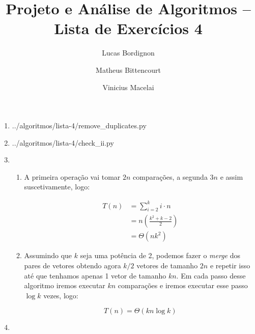 \documentclass{article}
\title{Projeto e Análise de Algoritmos -- Lista de Exercícios 4}
\author{Lucas Bordignon \and Matheus Bittencourt \and Vinicius Macelai}
\date{}
\begin{document}
\maketitle

\begin{enumerate}
	\item 
		{../algoritmos/lista-4/remove_duplicates.py}

	\item 
		{../algoritmos/lista-4/check_ii.py}

	\item \begin{enumerate}

		\item A primeira operação vai tomar $2n$ comparações, a segunda $3n$ e
		assim suscetivamente, logo:

		\begin{align*}
		T(n) &= \sum_{i=2}^{k}i\cdot n \\
		&= n\left(\frac{k^2 + k - 2}{2}\right) \\
		&= \Theta(nk^2)
		\end{align*}

		\item Assumindo que $k$ seja uma potência de 2, podemos fazer o
		\textit{merge} dos pares de vetores obtendo agora $k/2$ vetores de
		tamanho $2n$ e repetir isso até que tenhamos apenas 1 vetor de tamanho
		$kn$. Em cada passo desse algoritmo iremos executar $kn$ comparações e
		iremos executar esse passo $\log k$ vezes, logo:

		$$ T(n) = \Theta(kn \log k) $$

	\end{enumerate}

	\item

\end{enumerate}
\end{document}
